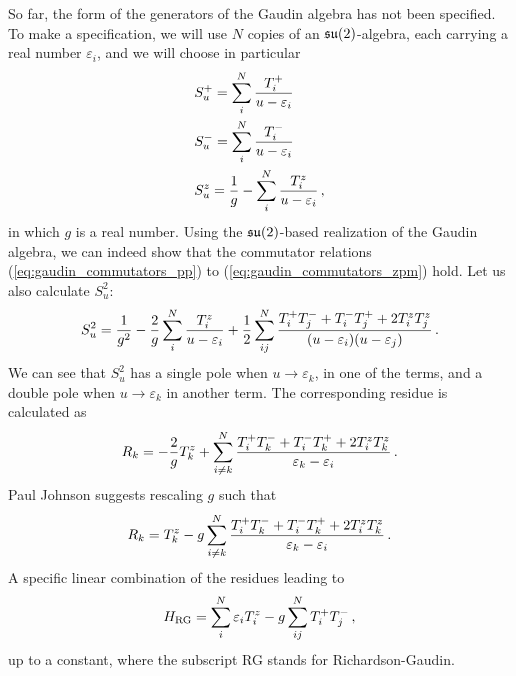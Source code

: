         So far, the form of the generators of the Gaudin algebra has not been specified. To make a specification, we will use $N$ copies of an $\operatorname{\mathfrak{su}}(2)$-algebra, each carrying a real number $\varepsilon_i$, and we will choose in particular
        \begin{align}
            & S^+_u = \sum_i^N \frac{T^+_i}{u - \varepsilon_i} \\
            & S^-_u = \sum_i^N \frac{T^-_i}{u - \varepsilon_i} \\
            & S^z_u = \frac{1}{g} - \sum_i^N \frac{T^z_i}{u - \varepsilon_i} \thinspace ,
        \end{align}
        in which $g$ is a real number. Using the $\operatorname{\mathfrak{su}}(2)$-based realization of the Gaudin algebra, we can indeed show that the commutator relations (\ref{eq:gaudin_commutators_pp}) to (\ref{eq:gaudin_commutators_zpm}) hold. Let us also calculate $S^2_u$:
        \begin{equation}
            S^2_u = \frac{1}{g^2} - \frac{2}{g} \sum_i^N \frac{T^z_i}{u - \varepsilon_i} + \frac{1}{2} \sum_{ij}^N \frac{T^+_i T^-_j + T^-_i T^+_j + 2 T^z_i T^z_j}{(u - \varepsilon_i)(u - \varepsilon_j)} \thinspace .
        \end{equation}
        We can see that $S^2_u$ has a single pole when $u \to \varepsilon_k$, in one of the terms, and a double pole when $u \to \varepsilon_k$ in another term. The corresponding residue is calculated as
        \begin{equation}
            R_k = - \frac{2}{g} T^z_k + \sum_{i \neq k}^N \frac{T^+_i T^-_k + T^-_i T^+_k + 2 T^z_i T^z_k}{\varepsilon_k - \varepsilon_i} \thinspace .
        \end{equation}
        Paul Johnson \cite{johnsonphd} suggests rescaling $g$ such that
        \begin{equation}
            R_k = T^z_k - g \sum_{i \neq k}^N \frac{T^+_i T^-_k + T^-_i T^+_k + 2 T^z_i T^z_k}{\varepsilon_k - \varepsilon_i} \thinspace .
        \end{equation}
        A specific linear combination \cite{johnsonphd} of the residues leading to
        \begin{equation}
            H_{\text{RG}} = \sum_i^N \varepsilon_i T^z_i - g \sum_{ij}^N T^+_i T^-_j \thinspace ,
        \end{equation}
        up to a constant, where the subscript RG stands for Richardson-Gaudin.
